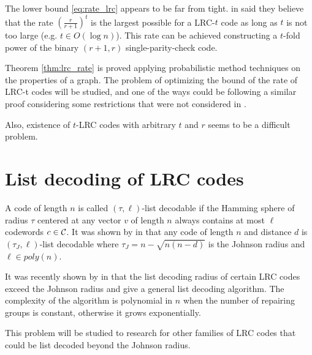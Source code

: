 The lower bound \ref{eq:rate_lrc} appears to be far from tight. \citeauthor{bounds_on_LRC_t} in \cite{bounds_on_LRC_t} said they believe that the rate $\left(\frac{r}{r+1}\right)^t$ is the largest possible for a LRC-$t$ code as long as $t$ is not too large (e.g. $t \in O(\log n)$). This rate can be achieved constructing a $t$-fold power of the binary $(r+1,r)$ single-parity-check code.

Theorem \ref{thm:lrc_rate} is proved applying probabilistic method techniques on the properties of a graph. The problem of optimizing the bound of the rate of LRC-t codes will be studied, and one of the ways could be following a similar proof considering some restrictions that were not considered in \cite{bounds_on_LRC}.

Also, existence of $t$-LRC codes with arbitrary $t$ and $r$ seems to be a difficult problem.

\section{List decoding of LRC codes}


A code of length $n$ is called $(\tau,\ell)$-list decodable if the Hamming sphere of radius $\tau$ centered at any vector $v$ of length $n$ always contains at most $\ell$ codewords $c \in {\mathcal C}$. It was shown by \citeauthor{list_decoding} in \cite{list_decoding} that any code of length $n$ and distance $d$ is $(\tau_J, \ell)$-list decodable where $\tau_J = n - \sqrt{n(n-d)}$ is the Johnson radius and $\ell \in poly(n)$.

It was recently shown by \citeauthor{list_decoding_LRC} in \cite{list_decoding_LRC} that the list decoding radius of certain LRC codes exceed the Johnson radius and give a general list decoding algorithm. The complexity of the algorithm is polynomial in $n$ when the number of repairing groups is constant, otherwise it grows exponentially.

This problem will be studied to research for other families of LRC codes that could be list decoded beyond the Johnson radius.
